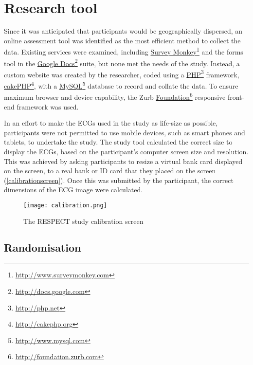 \section{Research tool}
\label{researchtool}

Since it was anticipated that participants would be geographically dispersed, an online assessment tool was identified as the most efficient method to collect the data. Existing services were examined, including \href{http://www.surveymonkey.com}{Survey Monkey}\footnote{\href{http://www.surveymonkey.com}{http:/\slash www.surveymonkey.com}} and the forms tool in the \href{http://docs.google.com}{Google Docs}\footnote{\href{http://docs.google.com}{http:/\slash docs.google.com}} suite, but none met the needs of the study. Instead, a custom website was created by the researcher, coded using a \href{http://php.net}{PHP}\footnote{\href{http://php.net}{http:/\slash php.net}} framework, \href{http://cakephp.org}{cakePHP}\footnote{\href{http://cakephp.org}{http:/\slash cakephp.org}}, with a \href{http://www.mysql.com}{MySQL}\footnote{\href{http://www.mysql.com}{http:/\slash www.mysql.com}} database to record and collate the data. To ensure maximum browser and device capability, the Zurb \href{http://foundation.zurb.com}{Foundation}\footnote{\href{http://foundation.zurb.com}{http:/\slash foundation.zurb.com}} responsive front-end framework was used.

In an effort to make the ECGs used in the study as life-size as possible, participants were not permitted to use mobile devices, such as smart phones and tablets, to undertake the study. The study tool calculated the correct size to display the ECGs, based on the participant's computer screen size and resolution. This was achieved by asking participants to resize a virtual bank card displayed on the screen, to a real bank or ID card that they placed on the screen (\autoref{calibrationscreen}). Once this was submitted by the participant, the correct dimensions of the ECG image were calculated.

\begin{figure}[htbp]
\centering
\texttt{[image: calibration.png]}
\caption{The RESPECT study calibration screen}
\label{calibrationscreen}
\end{figure}



\subsection{Randomisation}
\label{randomisation}

